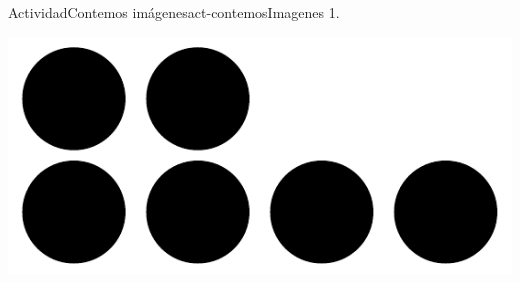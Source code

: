 \documentclass[20pt]{extarticle}
\begin{document}
\begin{activity}{Actividad}{Contemos imágenes}{act-contemosImagenes}%
1.%
\begin{image}{0}{1}{0}{}%
\includegraphics[max width=\linewidth, center]{external/svg-source/tikz-file-148269.pdf}
\end{image}%
\begin{image}{0}{1}{0}{}%

\end{image}
\end{activity}
\end{document}
